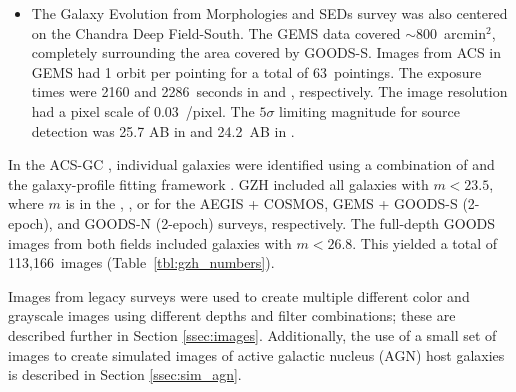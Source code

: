 \documentclass[twocolumn]{aastex6}
\begin{document}
\begin{itemize}
\item The Galaxy Evolution from Morphologies and SEDs
    \citep[GEMS;][]{rix04,cal08} survey was also centered on the Chandra Deep
    Field-South. The GEMS data covered $\sim800$~arcmin$^2$, completely surrounding
    the area covered by GOODS-S. Images from ACS in GEMS had 1 orbit per pointing
    for a total of 63~pointings. The exposure times were 2160 and 2286~seconds in
    \Vband{} and \zband{}, respectively. The image resolution had a pixel scale
    of 0.03~\arcsec/pixel. The $5\sigma$ limiting magnitude for source
    detection was 25.7 AB in \Vband{} and 24.2~AB in \zband. 

\end{itemize}

In the ACS-GC \citep{gri12}, individual galaxies were identified using a
combination of \sextractor{} \citep{ber96} and the galaxy-profile fitting
framework \galapagos{} \citep{bar12}. GZH included all galaxies with $m<23.5$,
where $m$ is in the \Iband, \zband, or \iband{} for the AEGIS + COSMOS, GEMS +
GOODS-S (2-epoch), and GOODS-N (2-epoch) surveys, respectively. The full-depth
GOODS images from both fields included galaxies with $m<26.8$. This yielded a
total of 113,166~images (Table~\ref{tbl:gzh_numbers}).

Images from \hst{} legacy surveys were used to create multiple different color
and grayscale images using different depths and filter combinations; these are
described further in Section \ref{ssec:images}. Additionally, the use of a
small set of \hst{} images to create simulated images of active galactic
nucleus (AGN) host galaxies is described in Section \ref{ssec:sim_agn}.


\end{document}
